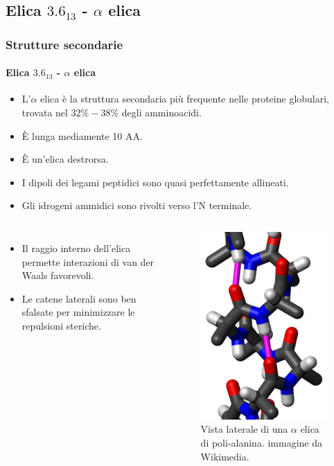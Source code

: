 \documentclass{beamer}
\begin{document}
\subsection{Elica $3.6_{13}$ - $\alpha$ elica}
\begin{frame}
 \frametitle{Strutture secondarie}
  \framesubtitle{Elica $3.6_{13}$ - $\alpha$ elica}

\begin{itemize}
\item L'$\alpha$ elica è la struttura secondaria più frequente nelle proteine globulari, trovata nel $32\%-38\%$ degli amminoacidi.
\pause \item È lunga mediamente 10 AA.
\pause \item È un'elica destrorsa.
\pause \item I dipoli dei legami peptidici sono quasi perfettamente allineati. 
\pause \item Gli idrogeni ammidici sono rivolti verso l'N terminale.
\end{itemize}\end{frame}\begin{frame}\begin{columns}
\begin{itemize}
\item Il raggio interno dell'elica permette interazioni di van der Waals favorevoli. 
\item Le catene laterali sono ben sfalsate per minimizzare le repulsioni steriche.

\end{itemize} \pause \vskip -10pt 
\begin{figure}
\includegraphics[scale=0.5]{alpha_helix.png}\caption{Vista laterale di una $\alpha$ elica di poli-alanina. \tiny{immagine da Wikimedia.}}
\end{figure}
\end{columns}
\end{frame}
\end{document}
